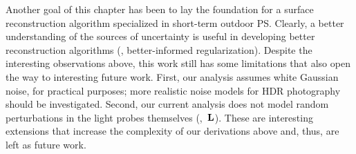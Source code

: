 Another goal of this chapter has been to lay the foundation for a surface reconstruction algorithm specialized in short-term outdoor PS. Clearly, a better understanding of the sources of uncertainty is useful in developing better reconstruction algorithms (\eg, better-informed regularization). Despite the interesting observations above, this work still has some limitations that also open the way to interesting future work. First, our analysis assumes white Gaussian noise, for practical purposes; more realistic noise models for HDR photography should be investigated. Second, our current analysis does not model random perturbations in the light probes themselves (\ie,~${\bf L}$). These are interesting extensions that increase the complexity of our derivations above and, thus, are left as future work. %








 

